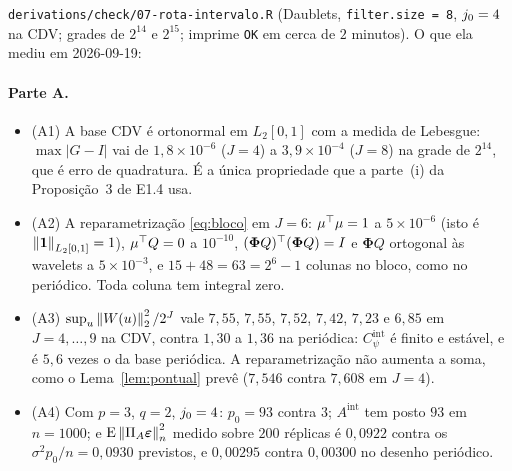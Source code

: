 \documentclass[11pt,a4paper]{article}
\newcommand{\bPhi}{\boldsymbol{\Phi}}
\newcommand{\Amat}{A}
\newcommand{\PA}{\Pi_{\Amat}}
\newcommand{\bveps}{\boldsymbol{\varepsilon}}
\newcommand{\Cpsiint}{C_{\psi}^{\mathrm{int}}}
\newcommand{\pzero}{p_{0}}
\begin{document}
\texttt{derivations/check/07-rota-intervalo.R} (Daublets, \texttt{filter.size
= 8}, $j_{0} = 4$ na CDV; grades de $2^{14}$ e $2^{15}$; imprime \texttt{OK}
em cerca de $2$ minutos). O que ela mediu em 2026-09-19:

\paragraph{Parte A.}
\begin{itemize}[leftmargin=*, nosep]
  \item (A1) A base CDV é ortonormal em $L_{2}[0,1]$ com a medida de Lebesgue:
    $\max|G - I|$ vai de $1{,}8\times10^{-6}$ ($J = 4$) a
    $3{,}9\times10^{-4}$ ($J = 8$) na grade de $2^{14}$, que é erro de
    quadratura. É a única propriedade que a parte~(i) da Proposição~3 de E1.4
    usa.
  \item (A2) A reparametrização \eqref{eq:bloco} em $J = 6$: $\mu^{\top}\mu = 1$ a
    $5\times10^{-6}$ (isto é $\left\lVert \mathbf{1} \right\rVert_{L_{2}[0,1]} = 1$),
    $\mu^{\top} Q = 0$ a $10^{-10}$, $(\bPhi Q)\T(\bPhi Q) = I$ e $\bPhi Q$
    ortogonal às wavelets a $5\times10^{-3}$, e $15 + 48 = 63 = 2^{6}-1$
    colunas no bloco, como no periódico. Toda coluna tem integral zero.
  \item (A3) $\sup_{u}\left\lVert W(u) \right\rVert_{2}^{2}/2^{J}$ vale $7{,}55$, $7{,}55$,
    $7{,}52$, $7{,}42$, $7{,}23$ e $6{,}85$ em $J = 4,\dots,9$ na CDV, contra
    $1{,}30$ a $1{,}36$ na periódica: $\Cpsiint$ é finito e estável, e é
    $5{,}6$ vezes o da base periódica. A reparametrização não aumenta a soma,
    como o Lema~\ref{lem:pontual} prevê ($7{,}546$ contra $7{,}608$ em
    $J = 4$).
  \item (A4) Com $p = 3$, $q = 2$, $j_{0} = 4$: $\pzero = 93$ contra $3$;
    $\Amat^{\mathrm{int}}$ tem posto $93$ em $n = 1000$; e
    $\E\normn{\PA\bveps}^{2}$ medido sobre $200$ réplicas é $0{,}0922$ contra
    os $\sigma^{2}\pzero/n = 0{,}0930$ previstos, e $0{,}00295$ contra
    $0{,}00300$ no desenho periódico.
\end{itemize}
\end{document}
